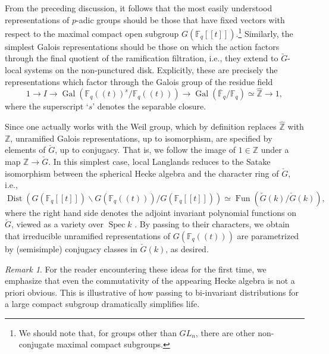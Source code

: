 \documentclass[10pt]{amsart}
\newcommand{\Fqt}{\Fq(\!(t)\!)}
\newcommand{\on}{\operatorname}
\newcommand{\Fq}{\mathbb{F}_q}
\theoremstyle{remark}
\newtheorem{re}[subsubsection]{Remark}
\numberwithin{equation}{section}
\newcommand{\cG}{\check{G}}
\begin{document}
	\subsubsection{} From the preceding discussion, 
	it follows that the most easily understood representations of $p$-adic 
	groups should be those that have fixed vectors with respect to the maximal 
	compact open subgroup $G(\Fq[[t]])$.\footnote{We should note that, for 
	groups 
	other 
	than $GL_n$, there 
	are other non-conjugate maximal compact subgroups.} Similarly, the simplest 
	Galois representations should be those on which the action factors through 
	the final quotient of the ramification filtration, i.e., they extend to 
	$\check{G}$-local systems on the non-punctured disk. Explicitly, these 
	are precisely the representations which factor through the Galois group of 
	the residue field 
%
\begin{equation} \label{e:galunramified}
 1 \rightarrow I \rightarrow \on{Gal}( \Fqt^s / \Fqt) \rightarrow 
 \on{Gal}(\overline{\mathbb{F}}_q / 
 \Fq) \simeq \widehat{\mathbb{Z}} \rightarrow 1,
\end{equation}
%	
where the superscript `$s$' denotes the separable closure. 
	
	Since one actually works with the Weil group, which by definition replaces 
	$\widehat{\mathbb{Z}}$ with $\mathbb{Z}$, unramified Galois 
	representations, up to isomorphism, are 
	specified by elements of $\check{G}$, up to conjugacy. That is, we follow the image 
	of $1 \in \mathbb{Z}$ under a map $\mathbb{Z} \rightarrow \cG$. In this simplest case, local 
	Langlands reduces to the Satake isomorphism between the spherical Hecke 
	algebra and the character ring of $\cG$, i.e., 
	\[    \on{Dist}(G(\Fq[[t]]) \backslash G(\Fqt) / G(\Fq[[t]])) \simeq 
	\on{Fun}(\cG(k) / \cG(k)),
	\]
	where the right hand side denotes the adjoint invariant polynomial 
	functions on $\cG$, viewed as a variety over $\on{Spec} k$ \cite{satake63}. By passing to 
	their characters, we obtain that 
	irreducible unramified 
	representations of $G(\Fqt)$ are 
	parametrized by (semisimple) conjugacy classes in $\cG(k)$, as desired.
	
	\begin{re} For 
	the reader 
	encountering these ideas for the first time, we emphasize that even the 
	commutativity of the appearing Hecke algebra is not a priori obvious. This is illustrative of how passing to bi-invariant distributions for a large 
	compact subgroup dramatically simplifies life.\end{re}
	
\end{document}
